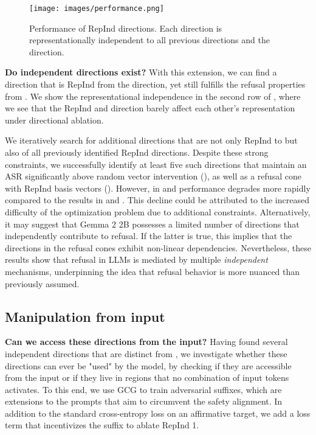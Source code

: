 \begin{figure}[t]
    \centering
    \texttt{[image: images/performance.png]}
    \vspace{-8pt}
    \caption{Performance of RepInd directions. Each direction is representationally independent to all previous directions and the \dimacro direction.}
    \label{fig:rep-performance}
\end{figure}

\textbf{Do independent directions exist?}
With this extension, we can find a direction that is RepInd from the \dimacro direction, yet still fulfills the refusal properties from . We show the representational independence in the second row of , where we see that the RepInd and \dimacro direction barely affect each other's representation under directional ablation.

We iteratively search for additional directions that are not only RepInd to \dimacro but also of all previously identified RepInd directions. Despite these strong constraints, we successfully identify at least five such directions that maintain an ASR significantly above random vector intervention (), as well as a refusal cone with RepInd basis vectors (). However, in  and  performance degrades more rapidly compared to the results in  and . This decline could be attributed to the increased difficulty of the optimization problem due to additional constraints. Alternatively, it may suggest that Gemma 2 2B possesses a limited number of directions that independently contribute to refusal. If the latter is true, this implies that the directions in the refusal cones exhibit non-linear dependencies.
Nevertheless, these results show that refusal in LLMs is mediated by multiple \emph{independent} mechanisms, underpinning the idea that refusal behavior is more nuanced than previously assumed.

\subsection{Manipulation from input}
\textbf{Can we access these directions from the input?}
Having found several independent directions that are distinct from \dimacro, we investigate whether these directions can ever be "used" by the model, by checking if they are accessible from the input or if they live in regions that no combination of input tokens activates. To this end, we use GCG \cite{zou_universal_2023} to train adversarial suffixes, which are extensions to the prompts that aim to circumvent the safety alignment. In addition to the standard cross-entropy loss on an affirmative target, we add a loss term that incentivizes the suffix to ablate RepInd 1. 

